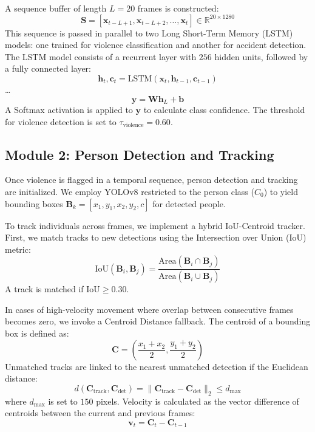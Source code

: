 \documentclass[conference]{IEEEtran}
\begin{document}
A sequence buffer of length $L = 20$ frames is constructed:
\begin{equation}
\mathbf{S} = [\mathbf{x}_{t-L+1}, \mathbf{x}_{t-L+2}, \dots, \mathbf{x}_t] \in \mathbb{R}^{20 \times 1280}
\end{equation}
This sequence is passed in parallel to two Long Short-Term Memory (LSTM) models: one trained for violence classification and another for accident detection. The LSTM model consists of a recurrent layer with $256$ hidden units, followed by a fully connected layer:
\begin{equation}
\mathbf{h}_t, \mathbf{c}_t = \text{LSTM}(\mathbf{x}_t, \mathbf{h}_{t-1}, \mathbf{c}_{t-1})
\end{equation}
\dots
\begin{equation}
\mathbf{y} = \mathbf{W} \mathbf{h}_L + \mathbf{b}
\end{equation}
A Softmax activation is applied to $\mathbf{y}$ to calculate class confidence. The threshold for violence detection is set to $\tau_{\text{violence}} = 0.60$.

\subsection{Module 2: Person Detection and Tracking}
Once violence is flagged in a temporal sequence, person detection and tracking are initialized. We employ YOLOv8 restricted to the person class ($C_0$) to yield bounding boxes $\mathbf{B}_k = [x_1, y_1, x_2, y_2, c]$ for detected people.

To track individuals across frames, we implement a hybrid IoU-Centroid tracker.
First, we match tracks to new detections using the Intersection over Union (IoU) metric:
\begin{equation}
\text{IoU}(\mathbf{B}_i, \mathbf{B}_j) = \frac{\text{Area}(\mathbf{B}_i \cap \mathbf{B}_j)}{\text{Area}(\mathbf{B}_i \cup \mathbf{B}_j)}
\end{equation}
A track is matched if $\text{IoU} \ge 0.30$. 

In cases of high-velocity movement where overlap between consecutive frames becomes zero, we invoke a Centroid Distance fallback. The centroid of a bounding box is defined as:
\begin{equation}
\mathbf{C} = \left( \frac{x_1 + x_2}{2}, \frac{y_1 + y_2}{2} \right)
\end{equation}
Unmatched tracks are linked to the nearest unmatched detection if the Euclidean distance:
\begin{equation}
d(\mathbf{C}_{\text{track}}, \mathbf{C}_{\text{det}}) = \|\mathbf{C}_{\text{track}} - \mathbf{C}_{\text{det}}\|_2 \le d_{\text{max}}
\end{equation}
where $d_{\text{max}}$ is set to $150$ pixels. Velocity is calculated as the vector difference of centroids between the current and previous frames:
\begin{equation}
\mathbf{v}_t = \mathbf{C}_t - \mathbf{C}_{t-1}
\end{equation}
\end{document}
